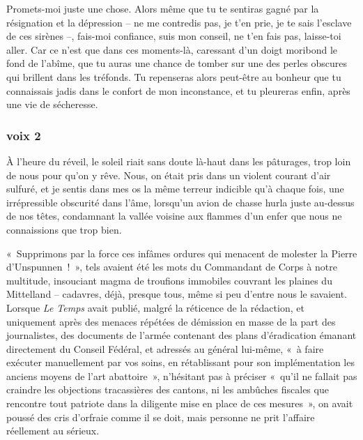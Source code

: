 \documentclass[
  extrafontsizes,
  oneside,
  14pt
]{memoir}
\begin{document}
Promets-moi juste une chose. Alors même que tu te sentiras gagné par la
résignation et la dépression -- ne me contredis pas, je t'en prie, je te
sais l'esclave de ces sirènes --, fais-moi confiance, suis mon conseil,
ne t'en fais pas, laisse-toi aller. Car ce n'est que dans ces
moments-là, caressant d'un doigt moribond le fond de l'abîme, que tu
auras une chance de tomber sur une des perles obscures qui brillent dans
les tréfonds. Tu repenseras alors peut-être au bonheur que tu
connaissais jadis dans le confort de mon inconstance, et tu pleureras
enfin, après une vie de sécheresse.

\newpage

\subsubsection{voix 2}\label{voix-2}

À l'heure du réveil, le soleil riait sans doute là-haut dans les
pâturages, trop loin de nous pour qu'on y rêve. Nous, on était pris dans
un violent courant d'air sulfuré, et je sentis dans mes os la même
terreur indicible qu'à chaque fois, une irrépressible obscurité dans
l'âme, lorsqu'un avion de chasse hurla juste au-dessus de nos têtes,
condamnant la vallée voisine aux flammes d'un enfer que nous ne
connaissions que trop bien.

«~Supprimons par la force ces infâmes ordures qui menacent de molester
la Pierre d'Unspunnen~!~», tels avaient été les mots du Commandant de
Corps à notre multitude, insouciant magma de troufions immobiles
couvrant les plaines du Mittelland -- cadavres, déjà, presque tous, même
si peu d'entre nous le savaient. Lorsque \emph{Le Temps} avait publié,
malgré la réticence de la rédaction, et uniquement après des menaces
répétées de démission en masse de la part des journalistes, des
documents de l'armée contenant des plans d'éradication émanant
directement du Conseil Fédéral, et adressés au général lui-même, «~à
faire exécuter manuellement par vos soins, en rétablissant pour son
implémentation les anciens moyens de l'art abattoire~», n'hésitant pas à
préciser «~qu'il ne fallait pas craindre les objections tracassières des
cantons, ni les ambûches fiscales que rencontre tout patriote dans la
diligente mise en place de ces mesures~», on avait poussé des cris
d'orfraie comme il se doit, mais personne ne prit l'affaire réellement
au sérieux.
\end{document}
